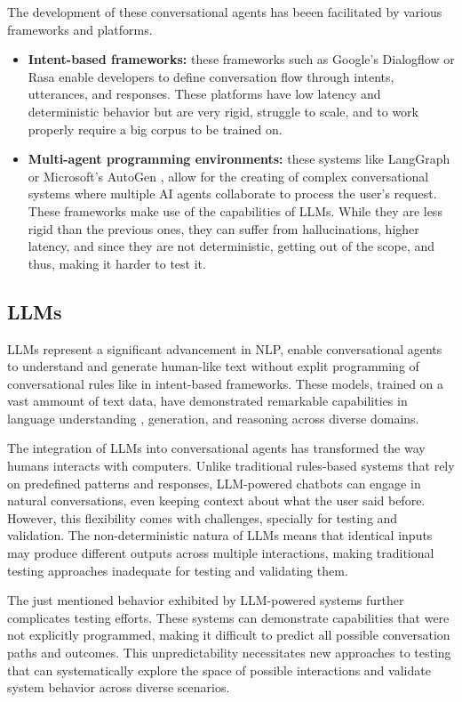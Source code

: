 The development of these conversational agents
has beeen facilitated by various frameworks and platforms.
\begin{itemize}
  \item \textbf{Intent-based frameworks:}
    these frameworks such as Google's Dialogflow \autocite{Dialogflow} or Rasa \autocite{Rasa2020}
    enable developers to define conversation flow through intents, utterances, and responses.
    These platforms have low latency and deterministic behavior
    but are very rigid, struggle to scale,
    and to work properly require a big corpus to be trained on.

  \item \textbf{Multi-agent programming environments:}
    these systems like LangGraph \autocite{LangGraph} or Microsoft's AutoGen \autocite{AutoGen},
    allow for the creating of complex conversational systems
    where multiple \ac{AI} agents collaborate to process the user's request.
    These frameworks make use of the capabilities of \acp{LLM}.
    While they are less rigid than the previous ones,
    they can suffer from hallucinations, 
    higher latency, and since they are not deterministic,
    getting out of the scope, and thus, making it harder to test it.
\end{itemize}

\subsection{\aclp{LLM}}

\aclp{LLM} represent a significant advancement in \acl{NLP},
enable conversational agents to understand and generate human-like text
without explit programming of conversational rules like in intent-based frameworks.
These models, trained on a vast ammount of text data,
have demonstrated remarkable capabilities in
language understanding \autocite{liEnhancingNaturalLanguage2024}, generation, and reasoning across diverse domains.

The integration of \acp{LLM} into conversational agents
has transformed the way humans interacts with computers.
Unlike traditional rules-based systems that rely on predefined patterns and responses,
\ac{LLM}-powered chatbots can engage in natural conversations,
even keeping context about what the user said before.
However, this flexibility comes with challenges,
specially for testing and validation.
The non-deterministic natura of \acp{LLM} means that
identical inputs may produce different outputs across multiple interactions,
making traditional testing approaches inadequate for testing and validating them.

The just mentioned behavior exhibited by \ac{LLM}-powered systems
further complicates testing efforts.
These systems can demonstrate capabilities that were not explicitly programmed,
making it difficult to predict all possible conversation paths and outcomes.
This unpredictability necessitates new approaches to testing
that can systematically explore the space of possible interactions
and validate system behavior across diverse scenarios.

